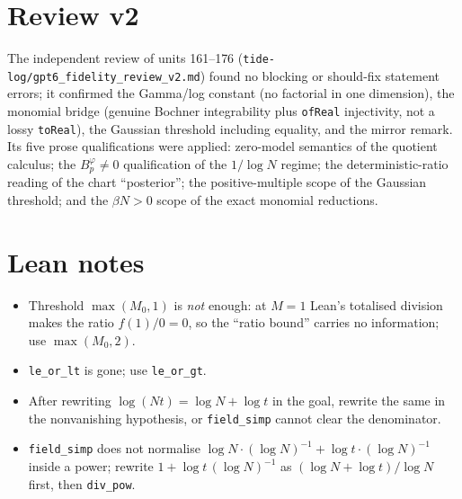 \documentclass[11pt]{article}
\begin{document}
\section{Review v2}
The independent review of units 161--176 (\texttt{tide-log/gpt6\_fidelity\_review\_v2.md}) found no
blocking or should-fix statement errors; it confirmed the Gamma/log constant (no factorial in one
dimension), the monomial bridge (genuine Bochner integrability plus \texttt{ofReal} injectivity, not
a lossy \texttt{toReal}), the Gaussian threshold including equality, and the mirror remark. Its five
prose qualifications were applied: zero-model semantics of the quotient calculus; the
$B^\varphi_p\neq0$ qualification of the $1/\log N$ regime; the deterministic-ratio reading of the
chart ``posterior''; the positive-multiple scope of the Gaussian threshold; and the $\beta N>0$ scope
of the exact monomial reductions.

\section{Lean notes}
\begin{itemize}
\item Threshold $\max(M_0,1)$ is \emph{not} enough: at $M=1$ Lean's totalised division makes the
ratio $f(1)/0=0$, so the ``ratio bound'' carries no information; use $\max(M_0,2)$.
\item \texttt{le\_or\_lt} is gone; use \texttt{le\_or\_gt}.
\item After rewriting $\log(Nt)=\log N+\log t$ in the goal, rewrite the same in the nonvanishing
hypothesis, or \texttt{field\_simp} cannot clear the denominator.
\item \texttt{field\_simp} does not normalise $\log N\cdot(\log N)^{-1}+\log t\cdot(\log N)^{-1}$
inside a power; rewrite $1+\log t\,(\log N)^{-1}$ as $(\log N+\log t)/\log N$ first, then
\texttt{div\_pow}.
\end{itemize}
\end{document}
